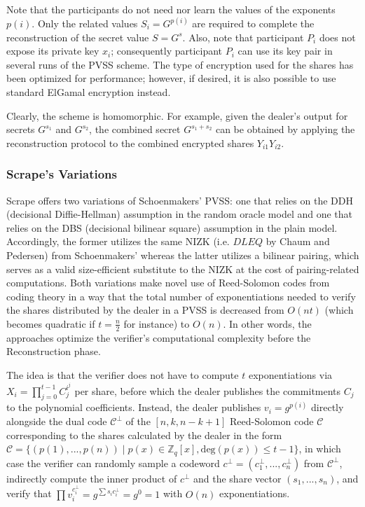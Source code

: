 \documentclass[11pt]{article}
\theoremstyle{definition}
\theoremstyle{remark}
\begin{document}
Note that the participants do not need nor learn the values of the exponents $p(i)$. Only the related values $S_i = G^{p(i)}$ are required to complete the reconstruction of the secret value $S = G^s$. Also, note that participant $P_i$ does not expose its private key $x_i$; consequently participant $P_i$ can use its key pair in several runs of the PVSS scheme. The type of encryption used for the shares has been optimized for performance; however, if desired, it is also possible to use standard ElGamal encryption instead.

Clearly, the scheme is homomorphic. For example, given the dealer's output for secrets $G^{s_1}$ and $G^{s_2}$, the combined secret $G^{s_1 + s_2}$ can be obtained by applying the reconstruction protocol to the combined encrypted shares $Y_{i1} Y_{i2}$.

\subsubsection{Scrape's Variations}
Scrape offers two variations of Schoenmakers' PVSS: one that relies on the DDH (decisional Diffie-Hellman) assumption in the random oracle model and one that relies on the DBS (decisional bilinear square) assumption in the plain model. Accordingly, the former utilizes the same NIZK (i.e. $DLEQ$ by Chaum and Pedersen) from Schoenmakers' whereas the latter utilizes a bilinear pairing, which serves as a valid size-efficient substitute to the NIZK at the cost of pairing-related computations. Both variations make novel use of Reed-Solomon codes from coding theory in a way that the total number of exponentiations needed to verify the shares distributed by the dealer in a PVSS is decreased from $O(n t)$ (which becomes quadratic if $t = \frac{n}{2}$ for instance) to $O(n)$. In other words, the approaches optimize the verifier's computational complexity before the Reconstruction phase.

The idea is that the verifier does not have to compute $t$ exponentiations via $X_i = \prod_{j = 0}^{t - 1} C_j^{i^j}$ per share, before which the dealer publishes the commitments $C_j$ to the polynomial coefficients. Instead, the dealer publishes $v_i = g^{p(i)}$ directly alongside the dual code $\mathcal{C}^\perp$ of the $[n, k, n - k + 1]$ Reed-Solomon code $\mathcal{C}$ corresponding to the shares calculated by the dealer in the form $\mathcal{C} = \{(p(1), ..., p(n)) \mid p(x) \in \mathbb{Z}_q[x], \text{deg}(p(x)) \leq t - 1\}$, in which case the verifier can randomly sample a codeword $c^\perp = (c_1^\perp, ..., c_n^\perp)$ from $\mathcal{C}^\perp$, indirectly compute the inner product of $c^\perp$ and the share vector $(s_1, ..., s_n)$, and verify that $\prod v_i^{c_i^\perp} = g^{\sum s_i c_i^\perp} = g^0 = 1$ with $O(n)$ exponentiations.
\end{document}
